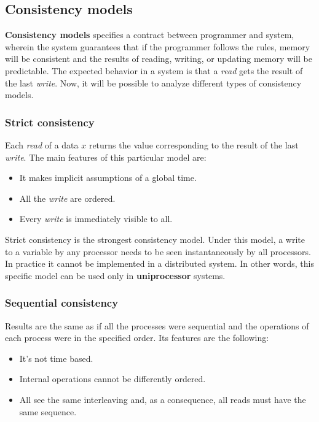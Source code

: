 \newpage 
\subsection{Consistency models} 
\textbf{Consistency models} specifies a contract between programmer and system, wherein the system guarantees that if the programmer follows the rules, memory will be consistent and the results of reading, writing, or updating memory will be predictable. The expected behavior in a system is that a \textit{read} gets the result of the last \textit{write}. Now, it will be possible to analyze different types of consistency models.
\subsubsection{Strict consistency}
Each \textit{read} of a data $x$ returns the value corresponding to the result of the last \textit{write}. The main features of this particular model are:
\begin{itemize}
	\item It makes implicit assumptions of a global time.
	\item All the \textit{write} are ordered.
	\item Every \textit{write} is immediately visible to all.
\end{itemize} 
Strict consistency is the strongest consistency model. Under this model, a write to a variable by any processor needs to be seen instantaneously by all processors. In practice it cannot be implemented in a distributed system. In other words, this specific model can be used only in \textbf{uniprocessor} systems. 

\subsubsection{Sequential consistency}
Results are the same as if all the processes were sequential and the operations of each process were in the specified order. Its features are the following:
\begin{itemize}
	\item It's not time based.
	\item Internal operations cannot be differently ordered.
	\item All see the same interleaving and, as a consequence, all reads must have the same sequence.
\end{itemize}

